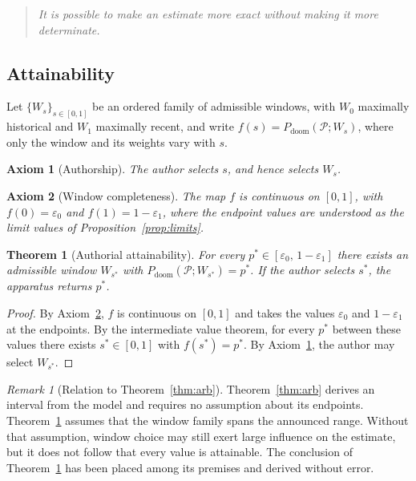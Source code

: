 \documentclass[11pt]{article}
\newtheorem{axiom}{Axiom}[section]
\newtheorem{theorem}{Theorem}[section]
\theoremstyle{remark}
\newtheorem{remark}{Remark}[section]
\newcommand{\PD}{P_{\mathrm{doom}}}
\newcommand{\eone}{\varepsilon_1}
\newcommand{\ezero}{\varepsilon_0}
\begin{document}
\begin{quote}
\emph{It is possible to make an estimate more exact without making it more determinate.}
\end{quote}

\subsection{Attainability}

Let $\{W_s\}_{s\in[0,1]}$ be an ordered family of admissible windows, with $W_0$ maximally historical and $W_1$ maximally recent, and write $f(s)=\PD(\mathcal{P};W_s)$, where only the window and its weights vary with $s$.

\begin{axiom}[Authorship]\label{ax:authorship}
The author selects $s$, and hence selects $W_s$.
\end{axiom}

\begin{axiom}[Window completeness]\label{ax:complete}
The map $f$ is continuous on $[0,1]$, with $f(0)=\ezero$ and $f(1)=1-\eone$, where the endpoint values are understood as the limit values of Proposition~\ref{prop:limits}.
\end{axiom}

\begin{theorem}[Authorial attainability]\label{thm:attain}
For every $p^{\ast}\in[\ezero,\,1-\eone]$ there exists an admissible window $W_{s^{\ast}}$ with $\PD(\mathcal{P};W_{s^{\ast}})=p^{\ast}$. If the author selects $s^{\ast}$, the apparatus returns $p^{\ast}$.
\end{theorem}
\begin{proof}
By Axiom~\ref{ax:complete}, $f$ is continuous on $[0,1]$ and takes the values $\ezero$ and $1-\eone$ at the endpoints. By the intermediate value theorem, for every $p^{\ast}$ between these values there exists $s^{\ast}\in[0,1]$ with $f(s^{\ast})=p^{\ast}$. By Axiom~\ref{ax:authorship}, the author may select $W_{s^{\ast}}$. \qedhere
\end{proof}

\begin{remark}[Relation to Theorem~\ref{thm:arb}]
Theorem~\ref{thm:arb} derives an interval from the model and requires no assumption about its endpoints. Theorem~\ref{thm:attain} assumes that the window family spans the announced range. Without that assumption, window choice may still exert large influence on the estimate, but it does not follow that every value is attainable. The conclusion of Theorem~\ref{thm:attain} has been placed among its premises and derived without error.
\end{remark}
\end{document}
